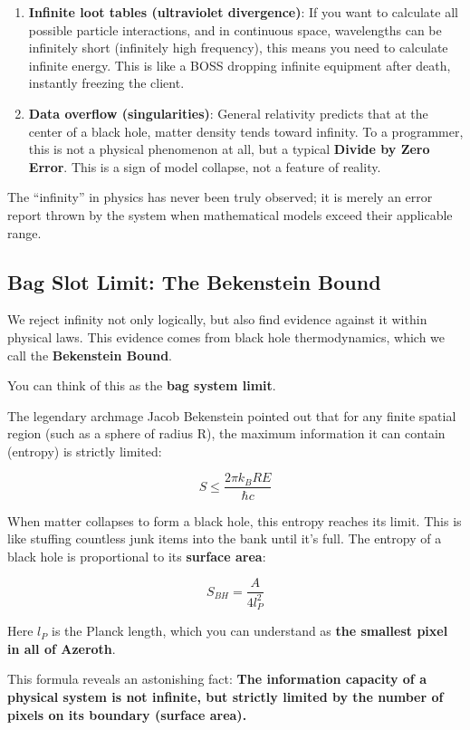 \begin{enumerate}
\item \textbf{Infinite loot tables (ultraviolet divergence)}: If you want to calculate all possible particle interactions, and in continuous space, wavelengths can be infinitely short (infinitely high frequency), this means you need to calculate infinite energy. This is like a BOSS dropping infinite equipment after death, instantly freezing the client.

\item \textbf{Data overflow (singularities)}: General relativity predicts that at the center of a black hole, matter density tends toward infinity. To a programmer, this is not a physical phenomenon at all, but a typical \textbf{Divide by Zero Error}. This is a sign of model collapse, not a feature of reality.
\end{enumerate}

The ``infinity'' in physics has never been truly observed; it is merely an error report thrown by the system when mathematical models exceed their applicable range.

\subsection{Bag Slot Limit: The Bekenstein Bound}

We reject infinity not only logically, but also find evidence against it within physical laws. This evidence comes from black hole thermodynamics, which we call the \textbf{Bekenstein Bound}.

You can think of this as the \textbf{bag system limit}.

The legendary archmage Jacob Bekenstein pointed out that for any finite spatial region (such as a sphere of radius R), the maximum information it can contain (entropy) is strictly limited:

\[
S \le \frac{2\pi k_B R E}{\hbar c}
\]

When matter collapses to form a black hole, this entropy reaches its limit. This is like stuffing countless junk items into the bank until it's full. The entropy of a black hole is proportional to its \textbf{surface area}:

\[
S_{BH} = \frac{A}{4 l_P^2}
\]

Here $l_P$ is the Planck length, which you can understand as \textbf{the smallest pixel in all of Azeroth}.

This formula reveals an astonishing fact: \textbf{The information capacity of a physical system is not infinite, but strictly limited by the number of pixels on its boundary (surface area).}

